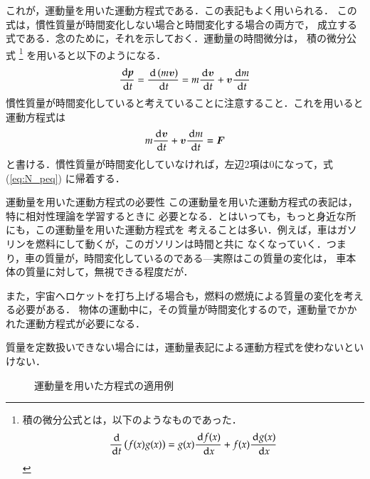                 これが，運動量を用いた運動方程式である．この表記もよく用いられる．
                この式は，慣性質量が時間変化しない場合と時間変化する場合の両方で，
                成立する式である．念のために，それを示しておく．運動量の時間微分は，
                積の微分公式
                    \footnote{
                        積の微分公式とは，以下のようなものであった．
                        \begin{equation*}
                            \frac{\,\mathrm{d} }{\,\mathrm{d} t}\left( f(x)g(x) \right)
                            =
                            g(x)\frac{\,\mathrm{d} f(x)}{\,\mathrm{d} x}+f(x)\frac{\,\mathrm{d} g(x)}{\,\mathrm{d} x}
                        \end{equation*}
                    }
                を用いると以下のようになる．
                    \begin{align}
                        \frac{\,\mathrm{d}\textit{\textbf{p}}}{\,\mathrm{d} t}
                        =\frac{\,\mathrm{d} \left(m\boldsymbol{v}\right)}{\,\mathrm{d} t}
                        =m\frac{\,\mathrm{d}\boldsymbol{v}}{\,\mathrm{d} t}
                        +\boldsymbol{v}\frac{\,\mathrm{d} m}{\,\mathrm{d} t}
                    \end{align}
                慣性質量が時間変化していると考えていることに注意すること．これを用いると運動方程式は
                    \begin{align}
                        m\frac{\,\mathrm{d}\boldsymbol{v}}{\,\mathrm{d} t}
                        +\boldsymbol{v}\frac{\,\mathrm{d} m}{\,\mathrm{d} t}
                        =\boldsymbol{F}
                    \end{align}
                と書ける．慣性質量が時間変化していなければ，左辺2項は0になって，式(\ref{eq:N_peq})
                に帰着する．

                \begin{memo}{運動量を用いた運動方程式の必要性}
                    この運動量を用いた運動方程式の表記は，特に相対性理論を学習するときに
                    必要となる．とはいっても，もっと身近な所にも，この運動量を用いた運動方程式を
                    考えることは多い．例えば，車はガソリンを燃料にして動くが，このガソリンは時間と共に
                    なくなっていく．つまり，車の質量が，時間変化しているのである---実際はこの質量の変化は，
                    車本体の質量に対して，無視できる程度だが．

                    また，宇宙へロケットを打ち上げる場合も，燃料の燃焼による質量の変化を考える必要がある．
                    物体の運動中に，その質量が時間変化するので，運動量でかかれた運動方程式が必要になる．

                    質量を定数扱いできない場合には，運動量表記による運動方程式を使わないといけない．
                \end{memo}
                    \begin{figure}[hbt]
                        \begin{center}
                            \caption{運動量を用いた方程式の適用例}
                            \label{fig:rocket1}
                        \end{center}
                    \end{figure}


